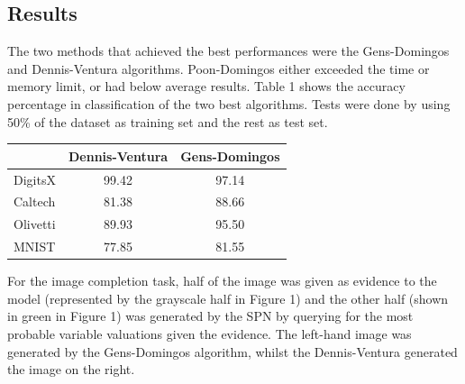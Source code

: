 \documentclass[10pt,a4paper]{article}
\begin{document}
\begin{multicols*}{2}

\section*{Results}


The two methods that achieved the best performances were the Gens-Domingos and Dennis-Ventura
algorithms.  Poon-Domingos either exceeded the time or memory limit, or had below average results.
Table 1 shows the accuracy percentage in classification of the two best algorithms. Tests were done
by using 50\% of the dataset as training set and the rest as test set.

\begin{tabular}{l|c|c}
  & Dennis-Ventura & Gens-Domingos\\
  \hline
  DigitsX & 99.42 & 97.14\\
  Caltech & 81.38 & 88.66\\
  Olivetti& 89.93 & 95.50\\
  MNIST   & 77.85 & 81.55\\
\end{tabular}

For the image completion task, half of the image was given as evidence to the model (represented by
the grayscale half in Figure 1) and the other half (shown in green in Figure 1) was generated by
the SPN by querying for the most probable variable valuations given the evidence. The left-hand
image was generated by the Gens-Domingos algorithm, whilst the Dennis-Ventura generated the image
on the right.


\end{multicols*}
\end{document}

